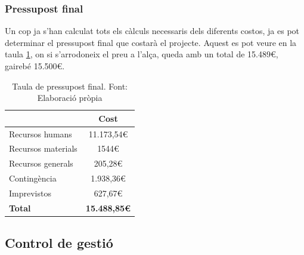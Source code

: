 \documentclass[a4paper]{article}
\begin{document}
\subsubsection{Pressupost final}

Un cop ja s'han calculat tots els càlculs necessaris dels diferents costos, ja es pot determinar el pressupost final que costarà el projecte. Aquest es pot veure en la taula \ref{tab:TaulaFinal}, on si s'arrodoneix el preu a l'alça, queda amb un total de 15.489€, gairebé 15.500€.

\begin{table}[H]
    \begin{center}
        \begin{tabular}{|l|c|}
            \hline
            \rowcolor[HTML]{9B9B9B} 
            {\color[HTML]{000000} \textbf{}}          & {\color[HTML]{000000} \textbf{Cost}}       \\ \hline
            {\color[HTML]{000000} Recursos humans}    & {\color[HTML]{000000} 11.173,54€}          \\ \hline
            {\color[HTML]{000000} Recursos materials} & {\color[HTML]{000000} 1544€}                \\ \hline
            {\color[HTML]{000000} Recursos generals}  & {\color[HTML]{000000} 205,28€}             \\ \hline
            {\color[HTML]{000000} Contingència}       & {\color[HTML]{000000} 1.938,36€}           \\ \hline
            {\color[HTML]{000000} Imprevistos}        & {\color[HTML]{000000} 627,67€}             \\ \hline
            \rowcolor[HTML]{C0C0C0} 
            {\color[HTML]{000000} \textbf{Total}}     & {\color[HTML]{000000} \textbf{15.488,85€}} \\ \hline
        \end{tabular}
        \caption[Taula de pressupost final]{Taula de pressupost final. Font: Elaboració pròpia}
        \label{tab:TaulaFinal}
    \end{center}
\end{table}

\subsection{Control de gestió}
\end{document}
